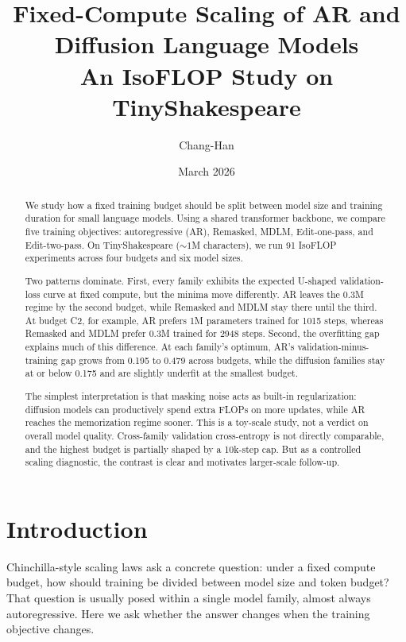 \documentclass[11pt,a4paper]{article}
\title{Fixed-Compute Scaling of AR and Diffusion Language Models\\[4pt]
\large An IsoFLOP Study on TinyShakespeare}
\author{Chang-Han}
\date{March 2026}
\begin{document}
\maketitle

\begin{abstract}
We study how a fixed training budget should be split between model size and training duration for small language models.
Using a shared transformer backbone, we compare five training objectives: autoregressive (AR), Remasked, MDLM, Edit-one-pass, and Edit-two-pass.
On TinyShakespeare (${\sim}1$M characters), we run 91 IsoFLOP experiments across four budgets and six model sizes.

Two patterns dominate.
First, every family exhibits the expected U-shaped validation-loss curve at fixed compute, but the minima move differently.
AR leaves the 0.3M regime by the second budget, while Remasked and MDLM stay there until the third.
At budget C2, for example, AR prefers 1M parameters trained for 1015 steps, whereas Remasked and MDLM prefer 0.3M trained for 2948 steps.
Second, the overfitting gap explains much of this difference.
At each family's optimum, AR's validation-minus-training gap grows from 0.195 to 0.479 across budgets, while the diffusion families stay at or below 0.175 and are slightly underfit at the smallest budget.

The simplest interpretation is that masking noise acts as built-in regularization: diffusion models can productively spend extra FLOPs on more updates, while AR reaches the memorization regime sooner.
This is a toy-scale study, not a verdict on overall model quality.
Cross-family validation cross-entropy is not directly comparable, and the highest budget is partially shaped by a 10k-step cap.
But as a controlled scaling diagnostic, the contrast is clear and motivates larger-scale follow-up.
\end{abstract}

\section{Introduction}
\label{sec:intro}

Chinchilla-style scaling laws ask a concrete question: under a fixed compute budget, how should training be divided between model size and token budget?
That question is usually posed within a single model family, almost always autoregressive.
Here we ask whether the answer changes when the training objective changes.
\end{document}
